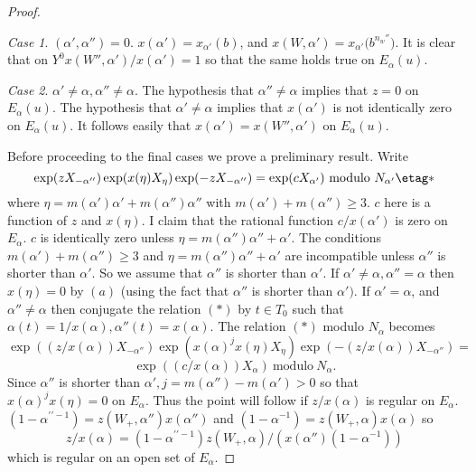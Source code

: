 \documentclass{memo-l}
\theoremstyle{definition}
\theoremstyle{remark}
\newtheorem{case}{Case}
\numberwithin{section}{chapter}
\numberwithin{equation}{chapter}
\begin{document}
\begin{proof}
\begin{case} %
$({\alpha}',{\alpha}'') = 0$.  $x({\alpha}')  =
x_{{\alpha}'}(b)$, and $x(W,{\alpha}')  =  x_{{\alpha}'}{(b^{n_w''}})$.
It is clear that on $Y^{0}$\quad $x(W'',{\alpha}')/x({\alpha}')  =  1$ so that the
same holds true on $E_{{\alpha}}(u)$.
\end{case}

\begin{case} %
${\alpha}' \ne {\alpha}, {\alpha}'' \ne {\alpha}$.  The
hypothesis that ${\alpha}'' \ne {\alpha}$ implies that $z = 0$ on
$E_{{\alpha}}(u)$.  The hypothesis that ${\alpha}' \ne {\alpha}$ implies
that $x({\alpha}')$ is not identically zero on $E_{{\alpha}}(u)$.  It
follows easily that $x({\alpha}')  =  x(W'',{\alpha}')$ on $E_{{\alpha}}(u)$.
\end{case}


   Before proceeding to the final cases we prove a preliminary result.
Write
$$
\exp(zX_{-{\alpha}''})\exp(x({\eta})X_{{\eta}})\exp(-zX_{-{\alpha}''})  =
\exp(cX_{{\alpha}'})\ {\text{modulo}}\ N_{{\alpha'}}  \etag *
$$
where ${\eta} = m({\alpha}'){\alpha}'+m({\alpha}''){\alpha''}$ with
$m({\alpha}')+m({\alpha}'') \ge 3$.  $c$ here is a function of $z$ and
$x({\eta})$.  I claim that the rational function $c/x({\alpha}')$ is zero
on $E_{{\alpha}}$.  $c$ is identically zero unless
$\eta = m(\alpha'')\alpha''+\alpha'$.
The conditions
$m({\alpha}')+m({\alpha}'') \ge 3$ and $\eta = m(\alpha'')\alpha''+\alpha'$
are incompatible unless ${\alpha}''$
is shorter than ${\alpha}'$.  So we assume that ${\alpha}''$ is shorter than
${\alpha}'$.  If ${\alpha}'\ne {\alpha}, {\alpha}'' = {\alpha}$ then
$x({\eta}) = 0$ by $(a)$ (using the fact that ${\alpha}''$ is shorter than
${\alpha}')$.  If ${\alpha}' = {\alpha}$, and ${\alpha''} \ne {\alpha}$ then
conjugate the relation $(*)$ by $t  \in  T_{0}$ such that
${\alpha}(t) = 1/x({\alpha}), {\alpha}''(t) = x({\alpha})$.  The relation $(*)$
modulo $N_{{\alpha}}$ becomes
$$
\exp((z/x({\alpha}))X_{-{\alpha}''})\exp(x({\alpha})^{j}x({\eta})X_{{\eta}})
\exp(-(z/x({\alpha}))X_{-{\alpha}''})
 =
$$
$$
\exp((c/x({\alpha}))X_{{\alpha}})\ {\text{modulo}}\  N_{{\alpha}}.
$$
Since ${\alpha}''$ is shorter than ${\alpha}', j = m({\alpha}'')-m({\alpha}')>0$
so that $x({\alpha})^{j}x({\eta}) = 0$ on $E_{{\alpha}}$.  Thus the point
will follow if $z/x({\alpha})$ is regular on $E_{{\alpha}}$.
$(1-{\alpha}^{\prime\prime-1}) = z(W_{+},{\alpha}'')x({\alpha}'')$ and $(1-{\alpha}^{-1})  =
z(W_{+},{\alpha})x({\alpha})$ so $$z/x({\alpha})  =
(1-{\alpha}^{\prime\prime-1})z(W_{+},{\alpha})/(x({\alpha}'')(1-{\alpha}^{-1}))$$ which is
regular on an open set of $E_{{\alpha}}$.


\end{proof}
\end{document}

